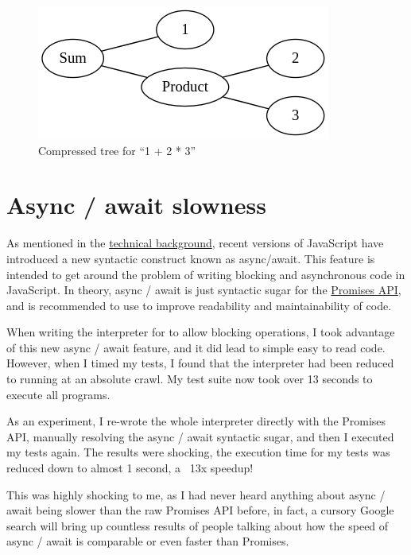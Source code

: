 \begin{figure}
    \caption{Compressed tree for ``1 + 2 * 3''}
    \label{setanta:compressedtree}
    \begin{center}
    \includegraphics[scale=0.8]{app2assets/smallgraph}
    \end{center}
\end{figure}

\section{Async / await slowness}
\label{solution:asyncawaitslowness}

As mentioned in the \hyperref[background:asyncawait]{technical background}, recent versions of JavaScript have introduced a new syntactic construct known as async/await. This feature is intended to get around the problem of writing blocking and asynchronous code in JavaScript. In theory, async / await is just syntactic sugar for the \hyperref[background:asyncawait]{Promises API}, and is recommended to use to improve readability and maintainability of code.

When writing the interpreter for \Setanta{} to allow blocking operations, I took advantage of this new async / await feature, and it did lead to simple easy to read code. However, when I timed my tests, I found that the interpreter had been reduced to running at an absolute crawl. My test suite now took over 13 seconds to execute all programs.

As an experiment, I re-wrote the whole interpreter directly with the Promises API, manually resolving the async / await syntactic sugar, and then I executed my tests again. The results were shocking, the execution time for my tests was reduced down to almost 1 second, a ~13x speedup!

This was highly shocking to me, as I had never heard anything about async / await being slower than the raw Promises API before, in fact, a cursory Google search will bring up countless results of people talking about how the speed of async / await is comparable or even faster than Promises.


